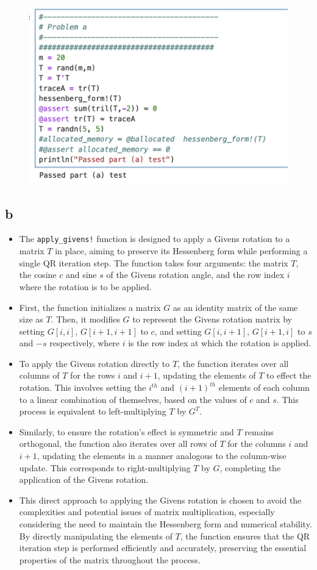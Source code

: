 \documentclass{article}
\begin{document}
\begin{figure}[H]
    \centering
    \includegraphics[width=0.75\linewidth]{Image 4-7-24 at 23.47 (1).jpeg}
\end{figure}

\subsection{b}
\begin{itemize}
    \item The \texttt{apply\_givens!} function is designed to apply a Givens rotation to a matrix $T$ in place, aiming to preserve its Hessenberg form while performing a single QR iteration step. The function takes four arguments: the matrix $T$, the cosine $c$ and sine $s$ of the Givens rotation angle, and the row index $i$ where the rotation is to be applied.
    \item First, the function initializes a matrix $G$ as an identity matrix of the same size as $T$. Then, it modifies $G$ to represent the Givens rotation matrix by setting $G[i, i]$, $G[i+1, i+1]$ to $c$, and setting $G[i, i+1]$, $G[i+1, i]$ to $s$ and $-s$ respectively, where $i$ is the row index at which the rotation is applied.
    \item To apply the Givens rotation directly to $T$, the function iterates over all columns of $T$ for the rows $i$ and $i+1$, updating the elements of $T$ to effect the rotation. This involves setting the $i^{th}$ and $(i+1)^{th}$ elements of each column to a linear combination of themselves, based on the values of $c$ and $s$. This process is equivalent to left-multiplying $T$ by $G^T$.
    \item Similarly, to ensure the rotation's effect is symmetric and $T$ remains orthogonal, the function also iterates over all rows of $T$ for the columns $i$ and $i+1$, updating the elements in a manner analogous to the column-wise update. This corresponds to right-multiplying $T$ by $G$, completing the application of the Givens rotation.
    \item This direct approach to applying the Givens rotation is chosen to avoid the complexities and potential issues of matrix multiplication, especially considering the need to maintain the Hessenberg form and numerical stability. By directly manipulating the elements of $T$, the function ensures that the QR iteration step is performed efficiently and accurately, preserving the essential properties of the matrix throughout the process.
    
\end{itemize}
\end{document}
